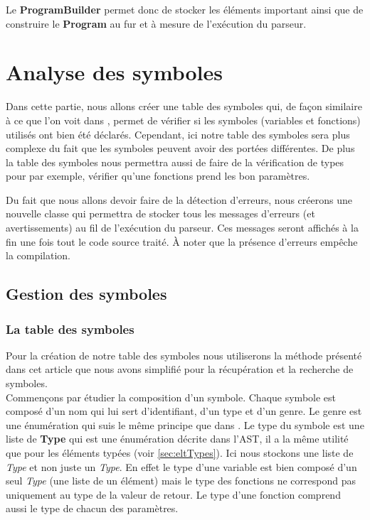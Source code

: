 \documentclass[a4paper]{article}%
\begin{document}
Le \textbf{ProgramBuilder} permet donc de stocker les éléments important ainsi
que de construire le \textbf{Program} au fur et à mesure de l'exécution du
parseur.


\section{Analyse des symboles}

Dans cette partie, nous allons créer une table des symboles qui, de façon
similaire à ce que l'on voit dans \cite{compilerFlexBison}, permet de vérifier
si les symboles (variables et fonctions) utilisés ont bien été déclarés.
Cependant, ici notre table des symboles sera plus complexe du fait que les
symboles peuvent avoir des portées différentes. De plus la table des symboles
nous permettra aussi de faire de la vérification de types pour par exemple,
vérifier qu'une fonctions prend les bon paramètres.

Du fait que nous allons devoir faire de la détection d'erreurs, nous créerons
une nouvelle classe qui permettra de stocker tous les messages d'erreurs (et
avertissements) au fil de l'exécution du parseur. Ces messages seront affichés à
la fin une fois tout le code source traité. À noter que la présence d'erreurs
empêche la compilation.

\subsection{Gestion des symboles}

\subsubsection*{La table des symboles}

Pour la création de notre table des symboles nous utiliserons la méthode
présenté dans cet article \cite{power2000symbol} que nous avons simplifié pour
la récupération et la recherche de symboles.\\

Commençons par étudier la composition d'un symbole. Chaque symbole est composé
d'un nom qui lui sert d'identifiant, d'un type et d'un genre. Le genre est une
énumération qui suis le même principe que dans \cite{power2000symbol}. Le type
du symbole est une liste de \textbf{Type} qui est une énumération décrite dans
l'AST, il a la même utilité que pour les éléments typées (voir
\ref{sec:eltTypes}). Ici nous stockons une liste de \textit{Type} et non
juste un \textit{Type}. En effet le type d'une variable est bien composé d'un
seul \textit{Type} (une liste de un élément) mais le type des fonctions ne
correspond pas uniquement au type de la valeur de retour. Le type d'une fonction
comprend aussi le type de chacun des paramètres.
\end{document}
